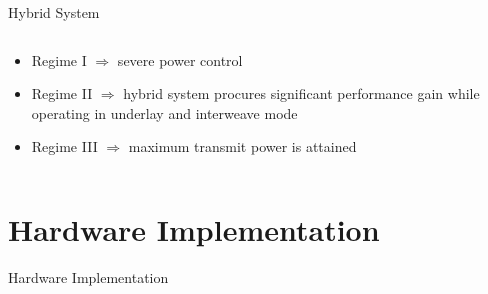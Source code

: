 \documentclass[16pt]{beamer}
\newif\ifhard
\begin{document}
\begin{frame}[t]{Hybrid System}
\begin{columns}
\begin{column}{0.55\columnwidth}
\begin{center}
{{
			}
                }
		\end{center}
		\vspace{-1mm}
		\begin{block}{}
			\begin{itemize}
				\item Regime I  $\Rightarrow$ severe power control
				\item Regime II $\Rightarrow$ hybrid system procures significant performance gain while operating in underlay and interweave mode
				\item Regime III $\Rightarrow$ maximum transmit power is attained 
			\end{itemize}	
		\end{block}
		\end{column}
	\end{columns}
\end{frame}

\fi


\ifhard

\section{Hardware Implementation}
\begin{frame}[c]{}
\begin{center}
Hardware Implementation
\end{center}
\end{frame}
\end{document}
